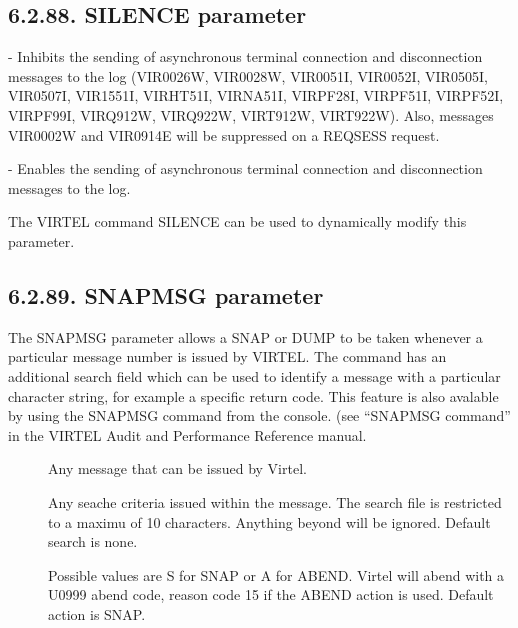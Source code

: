 \documentclass[letterpaper,10pt,english]{sphinxmanual}
\begin{document}
\subsection{6.2.88. SILENCE parameter}
\label{\detokenize{Installation_Guide:silence-parameter}}
\begin{sphinxVerbatim}[commandchars=\\\{\}]
 
\end{sphinxVerbatim}

 - Inhibits the sending of asynchronous terminal connection and disconnection messages to the log (VIR0026W, VIR0028W, VIR0051I, VIR0052I, VIR0505I, VIR0507I, VIR1551I, VIRHT51I, VIRNA51I, VIRPF28I, VIRPF51I, VIRPF52I, VIRPF99I, VIRQ912W, VIRQ922W, VIRT912W, VIRT922W). Also, messages VIR0002W and VIR0914E will be suppressed on a REQSESS request.

 - Enables the sending of asynchronous terminal connection and disconnection messages to the log.

The VIRTEL command SILENCE can be used to dynamically modify this parameter.


\subsection{6.2.89. SNAPMSG parameter}
\label{\detokenize{Installation_Guide:snapmsg-parameter}}
\begin{sphinxVerbatim}[commandchars=\\\{\}]
\end{sphinxVerbatim}

The SNAPMSG parameter allows a SNAP or DUMP to be taken whenever a particular message number is issued by VIRTEL. The command has an additional search field which can be used to identify a message with a particular character string, for example a specific return code. This feature is also avalable by using the SNAPMSG command from the console. (see “SNAPMSG command” in the VIRTEL Audit and Performance Reference manual.
\begin{description}
\item[{}] \leavevmode
Any message that can be issued by Virtel.

\item[{}] \leavevmode
Any seache criteria issued within the message. The search file is restricted to a maximu of 10 characters. Anything beyond will be ignored. Default search is none.

\item[{}] \leavevmode
Possible values are S for SNAP or A for ABEND. Virtel will abend with a U0999 abend code, reason code 15 if the ABEND action is used. Default action is SNAP.

\end{description}
\end{document}
